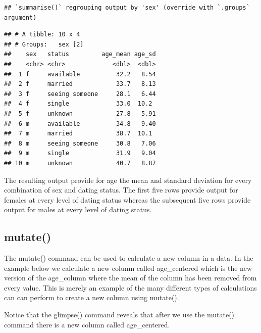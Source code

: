 \documentclass[
]{krantz}
\makeatletter
\newenvironment{Shaded}{\begin{snugshade}}{\end{snugshade}}
\newcommand{\DataTypeTok}[1]{\textcolor[rgb]{0.27,0.27,0.27}{#1}}
\newcommand{\KeywordTok}[1]{\textcolor[rgb]{0.27,0.27,0.27}{\textbf{#1}}}
\newcommand{\NormalTok}[1]{#1}
\newcommand{\OperatorTok}[1]{\textcolor[rgb]{0.43,0.43,0.43}{\textbf{#1}}}
\newcommand{\OtherTok}[1]{\textcolor[rgb]{0.37,0.37,0.37}{#1}}
\newcommand{\StringTok}[1]{\textcolor[rgb]{0.5,0.5,0.5}{#1}}
\newenvironment{kframe}{%
\medskip{}
\setlength{\fboxsep}{.8em}
 \def\at@end@of@kframe{}%
 \ifinner\ifhmode%
  \def\at@end@of@kframe{\end{minipage}}%
  \begin{minipage}{\columnwidth}%
 \fi\fi%
 \def\FrameCommand##1{\hskip\@totalleftmargin \hskip-\fboxsep
 \colorbox{shadecolor}{##1}\hskip-\fboxsep
     \hskip-\linewidth \hskip-\@totalleftmargin \hskip\columnwidth}%
 \MakeFramed {\advance\hsize-\width
   \@totalleftmargin\z@ \linewidth\hsize
   \@setminipage}}%
 {\par\unskip\endMakeFramed%
 \at@end@of@kframe}
\renewenvironment{Shaded}{\begin{kframe}}{\end{kframe}}
\makeatother
\begin{document}
\begin{verbatim}
## `summarise()` regrouping output by 'sex' (override with `.groups` argument)
\end{verbatim}

\begin{verbatim}
## # A tibble: 10 x 4
## # Groups:   sex [2]
##    sex   status         age_mean age_sd
##    <chr> <chr>             <dbl>  <dbl>
##  1 f     available          32.2   8.54
##  2 f     married            33.7   8.13
##  3 f     seeing someone     28.1   6.44
##  4 f     single             33.0  10.2 
##  5 f     unknown            27.8   5.91
##  6 m     available          34.8   9.40
##  7 m     married            38.7  10.1 
##  8 m     seeing someone     30.8   7.06
##  9 m     single             31.9   9.04
## 10 m     unknown            40.7   8.87
\end{verbatim}

The resulting output provide for age the mean and standard deviation for every combination of sex and dating status. The first five rows provide output for females at every level of dating status whereas the subsequent five rows provide output for males at every level of dating status.

\hypertarget{mutate}{%
\subsection{mutate()}\label{mutate}}

The mutate() command can be used to calculate a new column in a data. In the example below we calculate a new column called age\_centered which is the new version of the age\_column where the mean of the column has been removed from every value. This is merely an example of the many different types of calculations can can perform to create a new column using mutate().

\begin{Shaded}
\end{Shaded}

Notice that the glimpse() command reveals that after we use the mutate() command there is a new column called age\_centered.
\end{document}
